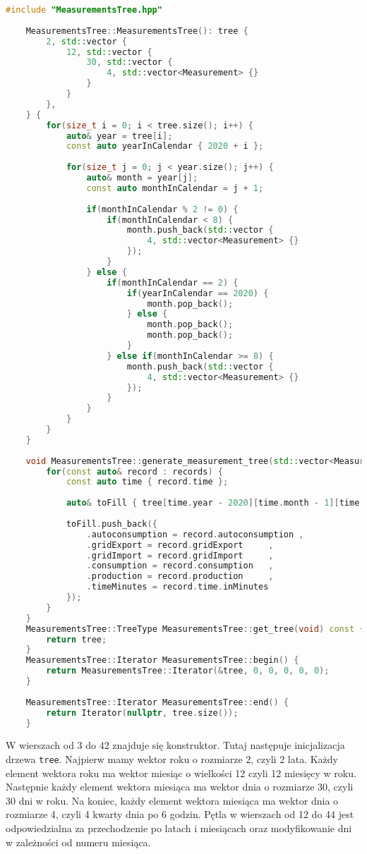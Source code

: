 \begin{lstlisting}[caption=Zawartość pliku \texttt{MeasurementsTree.cpp}, label={lst:measurementreecpp}, language=C++]
	#include "MeasurementsTree.hpp"
	
	MeasurementsTree::MeasurementsTree(): tree {
		2, std::vector {
			12, std::vector {
				30, std::vector {
					4, std::vector<Measurement> {}
				}
			}
		},
	} {
		for(size_t i = 0; i < tree.size(); i++) {
			auto& year = tree[i];
			const auto yearInCalendar { 2020 + i };
			
			for(size_t j = 0; j < year.size(); j++) {
				auto& month = year[j];
				const auto monthInCalendar = j + 1;
				
				if(monthInCalendar % 2 != 0) {
					if(monthInCalendar < 8) {
						month.push_back(std::vector {
							4, std::vector<Measurement> {}
						});
					}
				} else {
					if(monthInCalendar == 2) {
						if(yearInCalendar == 2020) {
							month.pop_back();
						} else { 
							month.pop_back();
							month.pop_back();
						}
					} else if(monthInCalendar >= 8) {
						month.push_back(std::vector {
							4, std::vector<Measurement> {}
						});
					}
				}
			}
		}
	}
	
	void MeasurementsTree::generate_measurement_tree(std::vector<MeasurementRecord> records) {
		for(const auto& record : records) {
			const auto time { record.time };
			
			auto& toFill { tree[time.year - 2020][time.month - 1][time.day - 1][time.quarter - 1] };
			
			toFill.push_back({ 
				.autoconsumption = record.autoconsumption ,
				.gridExport = record.gridExport     ,
				.gridImport = record.gridImport     ,
				.consumption = record.consumption   ,
				.production = record.production     ,
				.timeMinutes = record.time.inMinutes 
			});
		}
	}
	MeasurementsTree::TreeType MeasurementsTree::get_tree(void) const {
		return tree;
	}
	MeasurementsTree::Iterator MeasurementsTree::begin() {
		return MeasurementsTree::Iterator(&tree, 0, 0, 0, 0, 0);
	}
	
	MeasurementsTree::Iterator MeasurementsTree::end() {
		return Iterator(nullptr, tree.size());
	}
\end{lstlisting}
W wierszach od 3 do 42 znajduje się konstruktor. Tutaj następuje inicjalizacja drzewa \texttt{tree}. Najpierw mamy wektor roku o rozmiarze 2, czyli 2 lata. Każdy element wektora roku ma wektor miesiąc o wielkości 12 czyli 12 miesięcy w roku. Następnie każdy element wektora miesiąca ma wektor dnia o rozmiarze 30, czyli 30 dni w roku. Na koniec, każdy element wektora miesiąca ma wektor dnia o rozmiarze 4, czyli 4 kwarty dnia po 6 godzin. Pętla w wierszach od 12 do 44 jest odpowiedzialna za przechodzenie po latach i miesiącach oraz modyfikowanie dni w zależności od numeru miesiąca.
